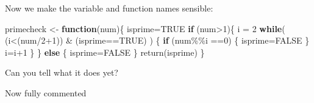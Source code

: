 \documentclass[
  12pt,
  a5paper,
]{book}
\newenvironment{Shaded}{\begin{snugshade}}{\end{snugshade}}
\newcommand{\ConstantTok}[1]{\textcolor[rgb]{0.00,0.00,0.00}{#1}}
\newcommand{\ControlFlowTok}[1]{\textcolor[rgb]{0.13,0.29,0.53}{\textbf{#1}}}
\newcommand{\DecValTok}[1]{\textcolor[rgb]{0.00,0.00,0.81}{#1}}
\newcommand{\FunctionTok}[1]{\textcolor[rgb]{0.00,0.00,0.00}{#1}}
\newcommand{\NormalTok}[1]{#1}
\newcommand{\OtherTok}[1]{\textcolor[rgb]{0.56,0.35,0.01}{#1}}
\newcommand{\SpecialCharTok}[1]{\textcolor[rgb]{0.00,0.00,0.00}{#1}}
\begin{document}
Now we make the variable and function names sensible:

\begin{Shaded}
\begin{Highlighting}[]
\NormalTok{primecheck }\OtherTok{\textless{}{-}} \ControlFlowTok{function}\NormalTok{(num)\{}
\NormalTok{  isprime}\OtherTok{=}\ConstantTok{TRUE}
  \ControlFlowTok{if}\NormalTok{ (num}\SpecialCharTok{\textgreater{}}\DecValTok{1}\NormalTok{)\{ }
\NormalTok{    i }\OtherTok{=} \DecValTok{2} 
      \ControlFlowTok{while}\NormalTok{( (i}\SpecialCharTok{\textless{}}\NormalTok{(num}\SpecialCharTok{/}\DecValTok{2}\SpecialCharTok{+}\DecValTok{1}\NormalTok{)) }\SpecialCharTok{\&}\NormalTok{ (isprime}\SpecialCharTok{==}\ConstantTok{TRUE}\NormalTok{) ) \{}
        \ControlFlowTok{if}\NormalTok{ (num}\SpecialCharTok{\%\%}\NormalTok{i }\SpecialCharTok{==}\DecValTok{0}\NormalTok{) \{}
\NormalTok{          isprime}\OtherTok{=}\ConstantTok{FALSE}
\NormalTok{        \}}
\NormalTok{        i}\OtherTok{=}\NormalTok{i}\SpecialCharTok{+}\DecValTok{1}
\NormalTok{      \}}
\NormalTok{  \} }\ControlFlowTok{else}\NormalTok{ \{}
\NormalTok{    isprime}\OtherTok{=}\ConstantTok{FALSE}
\NormalTok{  \}}
  \FunctionTok{return}\NormalTok{(isprime)}
\NormalTok{\}}
\end{Highlighting}
\end{Shaded}

Can you tell what it does yet?

Now fully commented
\end{document}
